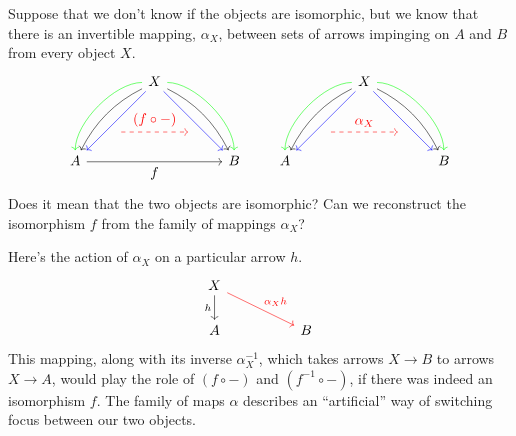 \documentclass[DaoFP]{subfiles}
\begin{document}
Suppose that we don't know if the objects are isomorphic, but we know that there is an invertible mapping, $\alpha_X$, between sets of arrows impinging on $A$ and $B$ from every object $X$. 
\[
 \begin{tikzcd}
 \node(x) at (0, 2) {X};
 \node(a) at (-2, 0) {A};
 \node(b) at (2, 0) {B};
 \node(c1) at (-1, 1.5) {};
 \node(c2) at (-1.5, 1) {};
 \node(c3) at (-1, 2) {};
 \node(c4) at (-2, 1) {};
 \node(d1) at (1, 1.5) {};
 \node(d2) at (1.5, 1) {};
 \node(d3) at (1, 2) {};
 \node(d4) at (2, 1) {};
\node (aa) at (-1, 0.75) {};
 \node (bb) at (1, 0.75) {};
 \draw[->] (x) .. controls (c1)  and (c2) .. (a); %
 \draw[->, green] (x) .. controls (c3)  and (c4) .. (a); %
 \draw[->, blue] (x) -- (a); 
  \draw[->] (x) .. controls (d1)  and (d2) .. (b); %
 \draw[->, green] (x) .. controls (d3)  and (d4) .. (b); %
 \draw[->, blue] (x) -- (b); 
 \draw[->, red, dashed] (aa) -- node[above]{(f \circ -)} (bb);
\draw[->] (a) -- node[below]{f} (b);
 \end{tikzcd}
 \qquad
 \begin{tikzcd}
 \node(x) at (0, 2) {X};
 \node(a) at (-2, 0) {A};
 \node(b) at (2, 0) {B};
 \node(c1) at (-1, 1.5) {};
 \node(c2) at (-1.5, 1) {};
 \node(c3) at (-1, 2) {};
 \node(c4) at (-2, 1) {};
 \node(d1) at (1, 1.5) {};
 \node(d2) at (1.5, 1) {};
 \node(d3) at (1, 2) {};
 \node(d4) at (2, 1) {};
\node (aa) at (-1, 0.75) {};
 \node (bb) at (1, 0.75) {};
 \draw[->] (x) .. controls (c1)  and (c2) .. (a); %
 \draw[->, green] (x) .. controls (c3)  and (c4) .. (a); %
 \draw[->, blue] (x) -- (a); 
  \draw[->] (x) .. controls (d1)  and (d2) .. (b); %
 \draw[->, green] (x) .. controls (d3)  and (d4) .. (b); %
 \draw[->, blue] (x) -- (b); 
 \draw[->, red, dashed] (aa) -- node[above]{\alpha_X} (bb);
 \end{tikzcd}
\]
Does it mean that the two objects are isomorphic? Can we reconstruct the isomorphism $f$ from the family of mappings $\alpha_X$?

Here's the action of $\alpha_X$ on a particular arrow $h$. 
\[
 \begin{tikzcd}
 X
 \arrow[d, "h"']
 \arrow[rrd, red, "\alpha_X h"]
  \\
 A
  && B
 \end{tikzcd}
\]
This mapping, along with its inverse $\alpha^{-1}_X$, which takes arrows $X \to B$ to arrows $X \to A$, would play the role of $(f \circ -)$ and $(f^{-1} \circ -)$, if there was indeed an isomorphism $f$. The family of maps $\alpha$ describes an ``artificial'' way of switching focus between our two objects.
\end{document}
